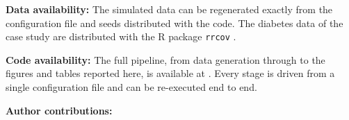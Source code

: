 \documentclass[pdflatex,referee]{sn-jnl}
\begin{document}
\noindent \textbf{Data availability:} The simulated data can be regenerated
  exactly from the configuration file and seeds distributed with the code. The
  diabetes data of the case study are distributed with the \textsf{R} package
  \texttt{rrcov} \citep{todorov2009}.

\noindent \textbf{Code availability:} The full pipeline, from data generation
  through to the figures and tables reported here, is available at
  \repourl{}. Every stage is driven
  from a single configuration file and can be re-executed end to end.

\noindent \textbf{Author contributions:} 


\end{document}
